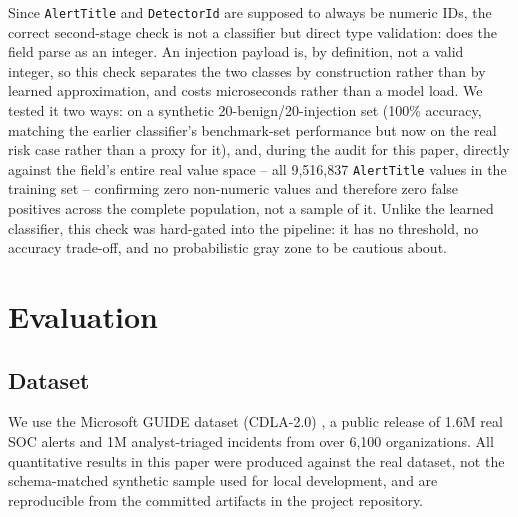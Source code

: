 \documentclass[conference]{IEEEtran}
\begin{document}
Since \texttt{AlertTitle} and \texttt{DetectorId} are supposed to always be numeric IDs, the
correct second-stage check is not a classifier but direct type validation: does the field parse
as an integer. An injection payload is, by definition, not a valid integer, so this check
separates the two classes by construction rather than by learned approximation, and costs
microseconds rather than a model load. We tested it two ways: on a synthetic 20-benign/20-injection
set (100\% accuracy, matching the earlier classifier's benchmark-set performance but now on the
real risk case rather than a proxy for it), and, during the audit for this paper, directly against
the field's entire real value space -- all 9{,}516{,}837 \texttt{AlertTitle} values in the training
set -- confirming zero non-numeric values and therefore zero false positives across the complete
population, not a sample of it. Unlike the learned classifier, this check was hard-gated into the
pipeline: it has no threshold, no accuracy trade-off, and no probabilistic gray zone to be
cautious about.

\section{Evaluation}

\subsection{Dataset}
\label{sec:dataset}

We use the Microsoft GUIDE dataset (CDLA-2.0) \cite{guide2024}, a public release of 1.6M real SOC alerts and 1M
analyst-triaged incidents from over 6{,}100 organizations. All quantitative results in this paper
were produced against the real dataset, not the schema-matched synthetic sample used for local
development, and are reproducible from the committed artifacts in the project repository.
\end{document}
